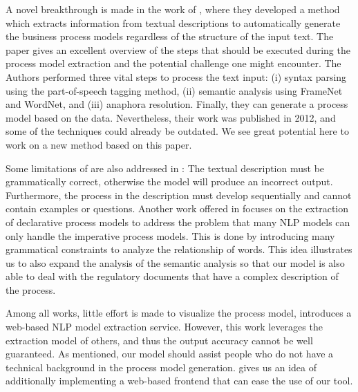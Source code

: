 	A novel breakthrough is made in the work of \cite{t2m_1}, where they developed a method which extracts information from textual descriptions to automatically generate the business process models regardless of the structure of the input text. The paper gives an excellent overview of the steps that should be executed during the process model extraction and the potential challenge one might encounter. The Authors performed three vital steps to process the text input: (i) syntax parsing using the part-of-speech tagging method, (ii) semantic analysis using FrameNet and WordNet, and (iii) anaphora resolution. Finally, they can generate a process model based on the data. Nevertheless, their work was published in 2012, and some of the techniques could already be outdated. We see great potential here to work on a new method based on this paper.
	
	 Some limitations of \cite{t2m_1} are also addressed in \cite{pre_processing_1}: The textual description must be grammatically correct, otherwise the model will produce an incorrect output. Furthermore, the process in the description must develop sequentially and cannot contain examples or questions. Another work offered in \cite{t2m_2} focuses on the extraction of declarative process models to address the problem that many NLP models can only handle the imperative process models. This is done by introducing many grammatical constraints to analyze the relationship of words. This idea illustrates us to also expand the analysis of the semantic analysis so that our model is also able to deal with the regulatory documents that have a complex description of the process. 
	 
	 Among all works, little effort is made to visualize the process model, \cite{complement_1} introduces a web-based NLP model extraction service. However, this work leverages the extraction model of others, and thus the output accuracy cannot be well guaranteed. As mentioned, our model should assist people who do not have a technical background in the process model generation. \cite{complement_1} gives us an idea of additionally implementing a web-based frontend that can ease the use of our tool.

	
	
	
	